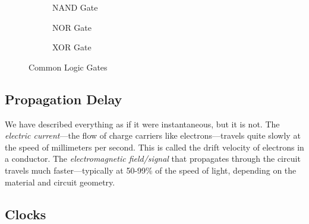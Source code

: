\begin{figure}[H]
    \begin{subfigure}[b]{0.32\textwidth}
      \centering
      \caption{NAND Gate}
      \label{fig:nand}
    \end{subfigure}
    \hfill 
    \begin{subfigure}[b]{0.32\textwidth}
      \centering
      \caption{NOR Gate}
      \label{fig:nor}
    \end{subfigure}
    \hfill 
    \begin{subfigure}[b]{0.32\textwidth}
      \centering
      \caption{XOR Gate}
      \label{fig:xor}
    \end{subfigure}
    \caption{Common Logic Gates}
    \label{fig:logic-gates}    
  \end{figure}

\subsection{Propagation Delay}

  We have described everything as if it were instantaneous, but it is not. The \textit{electric current}---the flow of charge carriers like electrons---travels quite slowly at the speed of millimeters per second. This is called the drift velocity of electrons in a conductor. The \textit{electromagnetic field/signal} that propagates through the circuit travels much faster---typically at 50-99\% of the speed of light, depending on the material and circuit geometry.

\subsection{Clocks}

